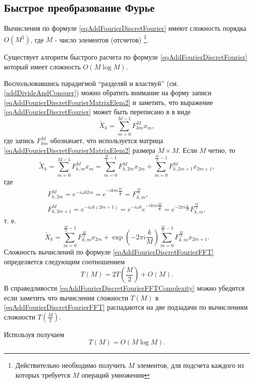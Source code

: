 \subsection{Быстрое преобразование Фурье}
Вычисления по формуле \eqref{eqAddFourierDiscretFourier} имеют
сложность порядка $O\left(M^2\right)$, где $M$ - число элементов (отсчетов)
\footnote{Действительно необходимо получить $M$ элементов, для
  подсчета каждого из которых требуется $M$ операций умножения}. 

Существует алгоритм быстрого расчета по формуле
\eqref{eqAddFourierDiscretFourier} который имеет сложность
$O\left(M \log{M}\right)$.

Воспользовавшись парадигмой ``разделяй и властвуй''
(см. \autoref{addDivideAndConquer}) можно 
обратить внимание на форму записи
\eqref{eqAddFourierDiscretFourierMatrixElem2} и 
заметить, что выражение
\eqref{eqAddFourierDiscretFourier} может быть переписано в
в виде 
\begin{equation}
\tilde{X}_k = \sum^{M - 1}_{m = 0} F_{km}^{M} x_m,
\nonumber
\end{equation}
где запись $F_{km}^{M}$ обозначает, что используется матрица
\eqref{eqAddFourierDiscretFourierMatrixElem2} размера $M\times M$.
Если $M$ четно, то 
\begin{equation}
\tilde{X}_k = \sum^{M - 1}_{m = 0} F_{k,m}^{M} x_m = 
\sum^{\frac{M}{2} - 1}_{m = 0} F_{k,2m}^M x_{2m} +
\sum^{\frac{M}{2} - 1}_{m = 0} F_{k,2m + 1}^M x_{2m + 1},
\nonumber
\end{equation}
где
\begin{eqnarray}
F_{k,2m}^{M} = e^{-i \omega k 2m} = e^{-i k m \frac{2\pi}{\frac{M}{2}}
} = F_{k,m}^{\frac{M}{2}},
\nonumber \\
F_{k,2m + 1}^{M} = e^{-i \omega k \left(2m+1\right)} = 
e^{-i \omega k}e^{-i k m \frac{2\pi}{\frac{M}{2}}} = 
e^{-2\pi i \frac{k}{M}}F_{k,m}^{\frac{M}{2}},
\nonumber
\end{eqnarray}
т. е.
\begin{equation}
\tilde{X}_k = \sum^{\frac{M}{2} - 1}_{m = 0} F_{k,m}^{\frac{M}{2}} x_{2m} +
\exp{\left(-2\pi i \frac{k}{M}\right)}
\sum^{\frac{M}{2} - 1}_{m = 0}  F_{k,m}^{\frac{M}{2}} x_{2m + 1}.
\label{eqAddFourierDiscretFourierFFT}
\end{equation}
Сложность вычислений по формуле
\eqref{eqAddFourierDiscretFourierFFT} определяется 
следующим соотношением
\begin{equation}
T\left( M \right) = 2 T\left( \frac{M}{2} \right) + O\left( M \right).
\label{eqAddFourierDiscretFourierFFTComplexity}
\end{equation}
В справедливости
\eqref{eqAddFourierDiscretFourierFFTComplexity} можно убедится
если заметить что вычисления сложности $T\left( M \right)$ в 
\eqref{eqAddFourierDiscretFourierFFT} распадаются 
на две подзадачи по вычислениям сложности $T\left( \frac{M}{2}
\right)$.

Используя  получаем 
\begin{equation}
T\left( M \right) = O\left( M \log{M} \right).
\nonumber
\end{equation}


